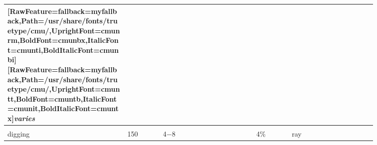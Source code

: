 \begin{longtable}{|>{\RaggedRight}p{0.27477\linewidth}|>{\RaggedRight}p{0.08330\linewidth}|>{\RaggedRight}p{0.21924\linewidth}|>{\RaggedRight}p{0.08716\linewidth}|>{\RaggedRight}p{0.19267\linewidth}|}
\allowbreak{}\setmainfont{cmunti.ttf}[RawFeature={fallback=myfallback},Path=/usr/share/fonts/truetype/cmu/,UprightFont=cmunrm,BoldFont=cmunbx,ItalicFont=cmunti,BoldItalicFont=cmunbi]\setmonofont{cmunti.ttf}[RawFeature={fallback=myfallback},Path=/usr/share/fonts/truetype/cmu/,UprightFont=cmuntt,BoldFont=cmuntb,ItalicFont=cmunit,BoldItalicFont=cmuntx]\itshape varies}\allowbreak{}\setmainfont{cmunrm.ttf}[RawFeature={fallback=myfallback},Path=/usr/share/fonts/truetype/cmu/,UprightFont=cmunrm,BoldFont=cmunbx,ItalicFont=cmunti,BoldItalicFont=cmunbi]\setmonofont{cmunrm.ttf}[RawFeature={fallback=myfallback},Path=/usr/share/fonts/truetype/cmu/,UprightFont=cmuntt,BoldFont=cmuntb,ItalicFont=cmunit,BoldItalicFont=cmuntx]\\ \hline \multicolumn{5}{|>{\RaggedRight}p{0.97143\linewidth}|}{\hspace*{0pt}\ignorespaces{}\hspace*{0pt}}\\ \hline \hspace*{0pt}\ignorespaces{}\hspace*{0pt}digging\footnotemark[27]&\hspace*{0pt}\ignorespaces{}\hspace*{0pt}150&\hspace*{0pt}\ignorespaces{}\hspace*{0pt}4{\mbox{$-$}}8&\hspace*{0pt}\ignorespaces{}\hspace*{0pt}4\%&\hspace*{0pt}\ignorespaces{}\hspace*{0pt}ray\\ \hline 
\end{longtable}
